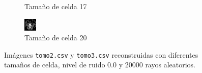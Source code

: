 \documentclass[a4paper]{article}
\begin{document}
\begin{figure}
\begin{subfigure}{0.4\linewidth}
  \caption{Tamaño de celda 17}
\end{subfigure}%
\begin{subfigure}{0.4\linewidth}
  \centering
  \includegraphics[width=0.6\linewidth]{celdas/tomo3-20-0}
  \caption{Tamaño de celda 20}
\end{subfigure}%

\caption{Imágenes \texttt{tomo2.csv} y \texttt{tomo3.csv} reconstruidas con diferentes tamaños de celda, nivel de ruido 0.0 y 20000 rayos aleatorios.}
\label{fig:muestras_celdas}
\end{figure}

\end{document}
